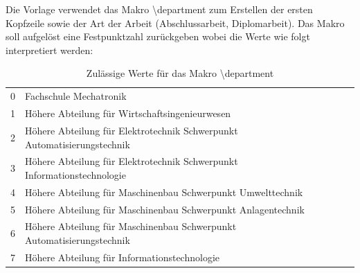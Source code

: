\renewcommand*{\authorOfNextLines}{Helmut Quinz}
Die Vorlage verwendet das Makro \textbackslash  department zum Erstellen der ersten Kopfzeile sowie der Art der Arbeit (Abschlussarbeit, Diplomarbeit).
Das Makro soll aufgelöst eine Festpunktzahl zurückgeben wobei die Werte wie folgt interpretiert werden:
\begin {table} [ht]
\begin{tabular}{cll}
	0	& Fachschule Mechatronik\\
	1	& Höhere Abteilung für Wirtschaftsingenieurwesen\\
	2	& Höhere Abteilung für Elektrotechnik Schwerpunkt Automatisierungstechnik\\
	3	& Höhere Abteilung für Elektrotechnik Schwerpunkt Informationstechnologie\\
	4	& Höhere Abteilung für Maschinenbau Schwerpunkt Umwelttechnik\\ 
	5	& Höhere Abteilung für Maschinenbau Schwerpunkt Anlagentechnik\\
	6	& Höhere Abteilung für Maschinenbau Schwerpunkt Automatisierungstechnik\\ 
	7	& Höhere Abteilung für Informationstechnologie\\
\end{tabular}
\caption {Zulässige Werte für das Makro \textbackslash  department}
\end {table}
\FloatBarrier